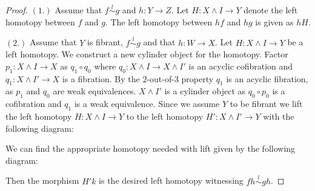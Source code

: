 \documentclass[../thesis.tex]{subfiles}
\begin{document}
            \begin{proof}
                $(1.)$ Assume that $f \overset{l}{\sim} g$ and $h:Y\rightarrow Z$. Let $H:X\wedge I \rightarrow Y$ denote the left homotopy between $f$ and $g$. The left homotopy between $hf$ and $hg$ is given as $hH$.

                $(2.)$ Assume that $Y$ is fibrant, $f \overset{l}{\sim} g$ and that $h:W\rightarrow X$. Let $H:X\wedge I\rightarrow Y$ be a left homotopy. We construct a new cylinder object for the homotopy. Factor $p_1:X\wedge I \rightarrow X$ as $q_1\circ q_0$ where $q_0: X\wedge I \rightarrow X\wedge I'$ is an acyclic cofibration and $q_1:X\wedge I'\rightarrow X$ is a fibration. By the $2$-out-of-$3$ property $q_1$ is an acyclic fibration, as $p_1$ and $q_0$ are weak equivalences. $X\wedge I'$ is a cylinder object as $q_0\circ p_0$ is a cofibration and $q_1$ is a weak equivalence. Since we assume $Y$ to be fibrant we lift the left homotopy $H:X\wedge I\rightarrow Y$ to the left homotopy $H':X\wedge I'\rightarrow Y$ with the following diagram:
                \begin{center}
                \end{center}
                We can find the appropriate homotopy needed with lift given by the following diagram:
                \begin{center}
                \end{center}
                Then the morphism $H'k$ is the desired left homotopy witnessing $fh \overset{l}{\sim} gh$.


\end{proof}
\end{document}
